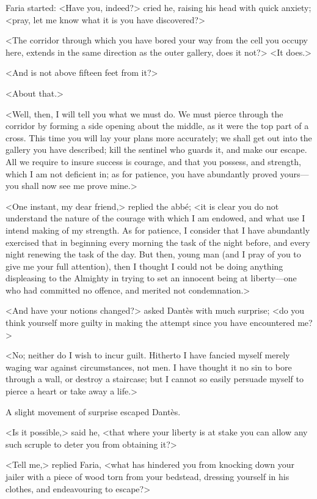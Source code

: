  Faria started: <Have you, indeed?> cried he, raising his head with quick anxiety; <pray, let me know what it is you have discovered?> 

 <The corridor through which you have bored your way from the cell you occupy here, extends in the same direction as the outer gallery, does it not?>  <It does.> 

 <And is not above fifteen feet from it?> 

 <About that.> 

 <Well, then, I will tell you what we must do. We must pierce through the corridor by forming a side opening about the middle, as it were the top part of a cross. This time you will lay your plans more accurately; we shall get out into the gallery you have described; kill the sentinel who guards it, and make our escape. All we require to insure success is courage, and that you possess, and strength, which I am not deficient in; as for patience, you have abundantly proved yours—you shall now see me prove mine.> 

 <One instant, my dear friend,> replied the abbé; <it is clear you do not understand the nature of the courage with which I am endowed, and what use I intend making of my strength. As for patience, I consider that I have abundantly exercised that in beginning every morning the task of the night before, and every night renewing the task of the day. But then, young man (and I pray of you to give me your full attention), then I thought I could not be doing anything displeasing to the Almighty in trying to set an innocent being at liberty—one who had committed no offence, and merited not condemnation.> 

 <And have your notions changed?> asked Dantès with much surprise; <do you think yourself more guilty in making the attempt since you have encountered me?> 

 <No; neither do I wish to incur guilt. Hitherto I have fancied myself merely waging war against circumstances, not men. I have thought it no sin to bore through a wall, or destroy a staircase; but I cannot so easily persuade myself to pierce a heart or take away a life.> 

 A slight movement of surprise escaped Dantès. 

 <Is it possible,> said he, <that where your liberty is at stake you can allow any such scruple to deter you from obtaining it?> 

 <Tell me,> replied Faria, <what has hindered you from knocking down your jailer with a piece of wood torn from your bedstead, dressing yourself in his clothes, and endeavouring to escape?> 

